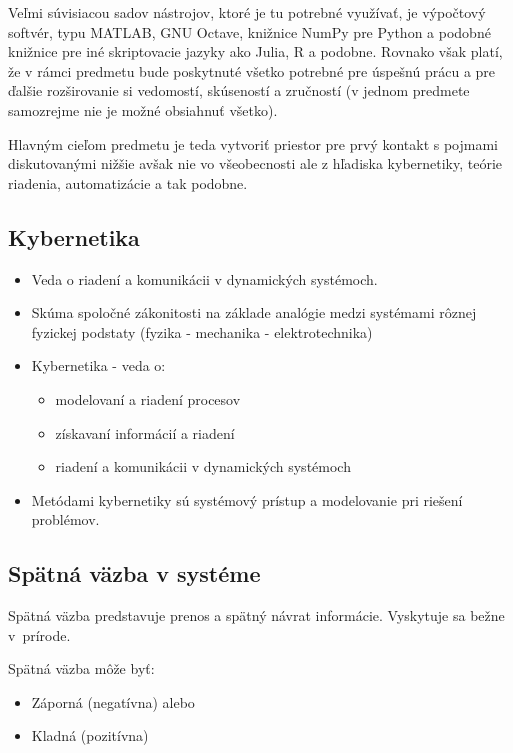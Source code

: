 \documentclass[a4paper, 10pt, ]{article}
\begin{document}
Veľmi súvisiacou sadov nástrojov, ktoré je tu potrebné využívať, je výpočtový softvér, typu MATLAB, GNU Octave, knižnice NumPy pre Python a podobné knižnice pre iné skriptovacie jazyky ako Julia, R a podobne. Rovnako však platí, že v rámci predmetu bude poskytnuté všetko potrebné pre úspešnú prácu a pre ďalšie rozširovanie si vedomostí, skúseností a zručností (v jednom predmete samozrejme nie je možné obsiahnuť všetko).

Hlavným cieľom predmetu je teda vytvoriť priestor pre prvý kontakt s pojmami diskutovanými nižšie avšak nie vo všeobecnosti ale z hľadiska kybernetiky, teórie riadenia, automatizácie a tak podobne.





\subsection{Kybernetika}

\begin{itemize}[leftmargin=0pt, labelsep=3mm, itemsep=0pt]
    \item Veda o riadení a komunikácii v dynamických systémoch.
    \item Skúma spoločné zákonitosti na základe analógie medzi systémami rôznej fyzickej podstaty (fyzika - mechanika - elektrotechnika)
    \item Kybernetika - veda o:
    \begin{itemize}
        \item modelovaní a riadení procesov
        \item získavaní informácií a riadení
        \item riadení a komunikácii v dynamických systémoch
    \end{itemize}
    \item Metódami kybernetiky sú systémový prístup a modelovanie pri riešení problémov.
\end{itemize}



\subsection{Spätná väzba v systéme}

Spätná väzba predstavuje prenos a spätný návrat informácie. Vyskytuje sa bežne v~prírode.

Spätná väzba môže byť:
\begin{itemize}
    \item Záporná (negatívna) alebo
    \item Kladná (pozitívna)
\end{itemize}
\end{document}
